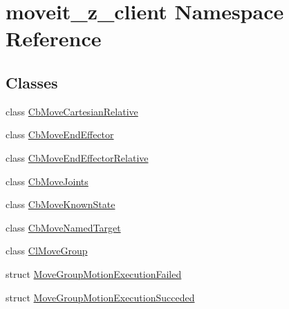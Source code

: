 \hypertarget{namespacemoveit__z__client}{}\section{moveit\+\_\+z\+\_\+client Namespace Reference}
\label{namespacemoveit__z__client}
\subsection*{Classes}
\begin{DoxyCompactItemize}
\item 
class \hyperlink{classmoveit__z__client_1_1CbMoveCartesianRelative}{Cb\+Move\+Cartesian\+Relative}
\item 
class \hyperlink{classmoveit__z__client_1_1CbMoveEndEffector}{Cb\+Move\+End\+Effector}
\item 
class \hyperlink{classmoveit__z__client_1_1CbMoveEndEffectorRelative}{Cb\+Move\+End\+Effector\+Relative}
\item 
class \hyperlink{classmoveit__z__client_1_1CbMoveJoints}{Cb\+Move\+Joints}
\item 
class \hyperlink{classmoveit__z__client_1_1CbMoveKnownState}{Cb\+Move\+Known\+State}
\item 
class \hyperlink{classmoveit__z__client_1_1CbMoveNamedTarget}{Cb\+Move\+Named\+Target}
\item 
class \hyperlink{classmoveit__z__client_1_1ClMoveGroup}{Cl\+Move\+Group}
\item 
struct \hyperlink{structmoveit__z__client_1_1MoveGroupMotionExecutionFailed}{Move\+Group\+Motion\+Execution\+Failed}
\item 
struct \hyperlink{structmoveit__z__client_1_1MoveGroupMotionExecutionSucceded}{Move\+Group\+Motion\+Execution\+Succeded}
\end{DoxyCompactItemize}
